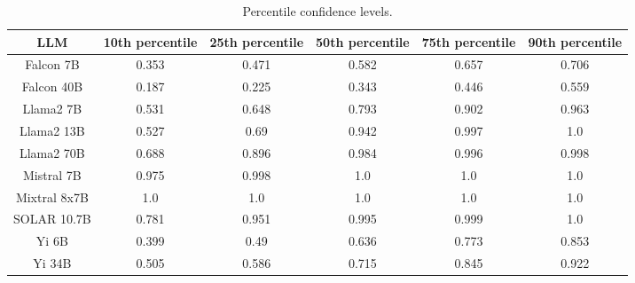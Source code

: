 \begin{table*}
\centering
\begin{tabular}{c|c|c|c|c|c}
LLM & 10th percentile & 25th percentile & 50th percentile & 75th percentile & 90th percentile\\ \hline
Falcon 7B & 0.353 & 0.471 & 0.582 & 0.657 & 0.706\\
Falcon 40B & 0.187 & 0.225 & 0.343 & 0.446 & 0.559\\
Llama2 7B & 0.531 & 0.648 & 0.793 & 0.902 & 0.963\\
Llama2 13B & 0.527 & 0.69 & 0.942 & 0.997 & 1.0\\
Llama2 70B & 0.688 & 0.896 & 0.984 & 0.996 & 0.998\\
Mistral 7B & 0.975 & 0.998 & 1.0 & 1.0 & 1.0\\
Mixtral 8x7B & 1.0 & 1.0 & 1.0 & 1.0 & 1.0\\
SOLAR 10.7B & 0.781 & 0.951 & 0.995 & 0.999 & 1.0\\
Yi 6B & 0.399 & 0.49 & 0.636 & 0.773 & 0.853\\
Yi 34B & 0.505 & 0.586 & 0.715 & 0.845 & 0.922\\
\hline
\end{tabular}
\caption{Percentile confidence levels.}
\label{tab:percentile_conf}
\end{table*}
